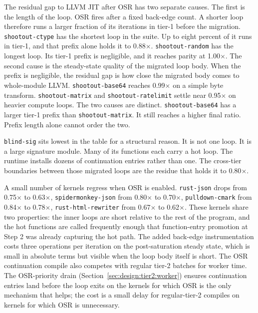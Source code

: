 The residual gap to LLVM JIT after OSR has two separate causes. The first is the length of the loop. OSR fires after a fixed back-edge count. A shorter loop therefore runs a larger fraction of its iterations in tier-1 before the migration. \texttt{shootout-ctype} has the shortest loop in the suite. Up to eight percent of it runs in tier-1, and that prefix alone holds it to 0.88$\times$. \texttt{shootout-random} has the longest loop. Its tier-1 prefix is negligible, and it reaches parity at 1.00$\times$. The second cause is the steady-state quality of the migrated loop body. When the prefix is negligible, the residual gap is how close the migrated body comes to whole-module LLVM. \texttt{shootout-base64} reaches 0.99$\times$ on a simple byte transform. \texttt{shootout-matrix} and \texttt{shootout-ratelimit} settle near 0.95$\times$ on heavier compute loops. The two causes are distinct. \texttt{shootout-base64} has a larger tier-1 prefix than \texttt{shootout-matrix}. It still reaches a higher final ratio. Prefix length alone cannot order the two.

\texttt{blind-sig} sits lowest in the table for a structural reason. It is not one loop. It is a large signature module. Many of its functions each carry a hot loop. The runtime installs dozens of continuation entries rather than one. The cross-tier boundaries between those migrated loops are the residue that holds it to 0.80$\times$.

A small number of kernels regress when OSR is enabled. \texttt{rust-json} drops from 0.75$\times$ to 0.63$\times$, \texttt{spidermonkey-json} from 0.80$\times$ to 0.70$\times$, \texttt{pulldown-cmark} from 0.84$\times$ to 0.78$\times$, \texttt{rust-html-rewriter} from 0.67$\times$ to 0.62$\times$. These kernels share two properties: the inner loops are short relative to the rest of the program, and the hot functions are called frequently enough that function-entry promotion at Step 2 was already capturing the hot path. The added back-edge instrumentation costs three operations per iteration on the post-saturation steady state, which is small in absolute terms but visible when the loop body itself is short. The OSR continuation compile also competes with regular tier-2 batches for worker time. The OSR-priority drain (Section~\ref{sec:design:tier2:worker}) ensures continuation entries land before the loop exits on the kernels for which OSR is the only mechanism that helps; the cost is a small delay for regular-tier-2 compiles on kernels for which OSR is unnecessary.

